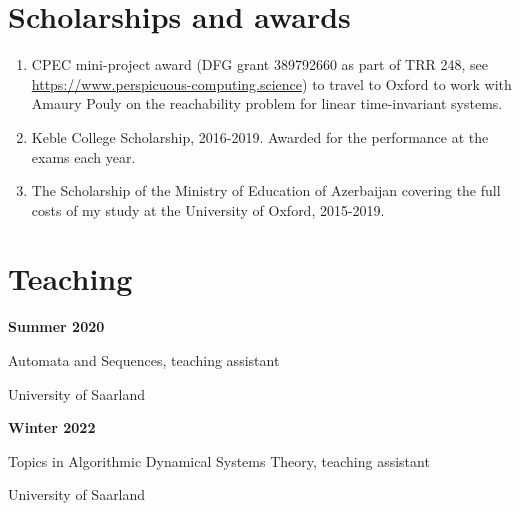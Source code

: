 \documentclass{article}
\begin{document}
	\section*{Scholarships and awards}
	\begin{enumerate}
		\item CPEC mini-project award (DFG grant 389792660 as part of TRR 248, see \href{https://www.perspicuous-computing.science/}{https://www.perspicuous-computing.science}) to travel to Oxford to work with Amaury Pouly on the reachability problem for linear time-invariant systems.
		\item Keble College Scholarship, 2016-2019. Awarded for the performance at the exams each year.
		\item The Scholarship of the Ministry of Education of Azerbaijan covering the full costs of my study at the University of Oxford, 2015-2019.
	\end{enumerate}
	
	\section*{Teaching}
	\noindent\begin{minipage}{0.3\textwidth}
		\hspace{0.5cm} \textbf{Summer 2020}
	\end{minipage}
	\begin{minipage}{0.7\textwidth}
		Automata and Sequences, teaching assistant 
		
		University of Saarland
	\end{minipage}
	
	\vspace{0.3cm}
	
	\noindent\begin{minipage}{0.3\textwidth}
		\hspace{0.5cm} \textbf{Winter 2022}
	\end{minipage}
	\begin{minipage}{0.7\textwidth}
		Topics in Algorithmic Dynamical Systems Theory, teaching assistant 
		
		University of Saarland
	\end{minipage}
	
\end{document}
